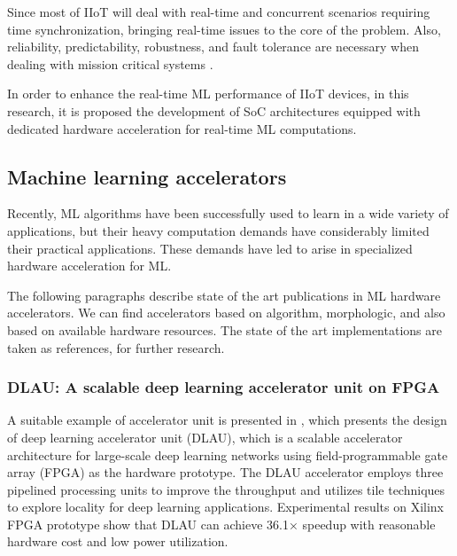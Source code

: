 Since most of IIoT will deal with real-time and concurrent scenarios requiring time synchronization, bringing real-time issues to the core of the problem. Also, reliability, predictability, robustness, and fault tolerance are necessary when dealing with mission critical systems \cite{de2018application}.

In order to enhance the real-time ML performance of IIoT devices, in this research, it is proposed the development of SoC architectures equipped with dedicated hardware acceleration for real-time ML computations.

\subsection{Machine learning accelerators}
Recently, ML algorithms have been successfully used to learn in a wide variety of applications, but their heavy computation demands have considerably limited their practical applications. These demands have led to arise in specialized hardware acceleration for ML.

The following paragraphs describe state of the art publications in ML hardware accelerators. We can find accelerators based on algorithm, morphologic, and also based on available hardware resources. The state of the art implementations are taken as references, for further research.

\subsubsection{DLAU: A scalable deep learning accelerator unit on FPGA}

A suitable example of accelerator unit is presented in \cite{wang2016dlau}, which presents the design of deep learning accelerator unit (DLAU), which is a scalable accelerator architecture for large-scale deep learning networks using ﬁeld-programmable gate array (FPGA) as the hardware prototype. The DLAU accelerator employs three pipelined processing units to improve the throughput and utilizes tile techniques to explore locality for deep learning applications. Experimental results on Xilinx FPGA prototype show that DLAU can achieve 36.1× speedup with reasonable hardware cost and low power utilization.

